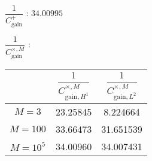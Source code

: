 \begin{minipage}{\linewidth}
    \begin{minipage}{\linewidth}
        \centering
        $\dfrac{1}{C_\text{gain}^+}$ : $34.00995$
    \end{minipage}

    \vspace{0.5cm}

    \begin{minipage}{\linewidth}
        \centering
        $\dfrac{1}{C_\text{gain}^{\times,M}}$ :
        \begin{tabular}{ccc}
            \toprule
            & $\dfrac{1}{C_{\text{gain},H^1}^{\times,M}}$ & $\dfrac{1}{C_{\text{gain},L^2}^{\times,M}}$ \\
            \midrule
            $M=3$ & 23.25845 & 8.224664 \\
            \midrule
            $M=100$ & 33.66473 & 31.651539 \\
            \midrule
            $M=10^5$ &  34.00960 & 34.007431 \\
            \bottomrule
        \end{tabular}
    \end{minipage}
\end{minipage}
